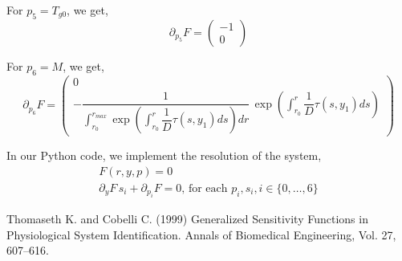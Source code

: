 \documentclass[11pt,a4paper]{article}
\begin{document}
\noindent
For $ p_5 = T_{g0} $, we get, 
$$\partial_{p_5} F = \begin{pmatrix} 
-1 \\  0
\end{pmatrix} 
$$


\noindent
For $ p_6 = M $, we get, 
$$\partial_{p_6} F = \begin{pmatrix} 
0 \\ 
- \dfrac{1}{\displaystyle \int_{r_{0}}^{r_{max}} \exp  \left(\displaystyle \int_{r_{0}}^{r} \dfrac{1}{D} \tau(s, y_1) ds \right) dr}  \, \exp \left(\displaystyle  \int_{r_{0}}^{r} \dfrac{1}{D} \tau(s, y_1) ds \right)
\end{pmatrix} 
$$


\vspace{1cm}
In our Python code, we implement the resolution of the system, 
$$\begin{array}{l}
F(r, y, p) = 0 \\
\partial_y F \, s_i + \partial_{p_i} F = 0 , \, \text{for each }p_i, s_i, i \in \lbrace 0, \dots, 6\rbrace
\end{array}$$

\vspace{1cm}


\begin{thebibliography}{10}

 Thomaseth K. and Cobelli C. (1999) Generalized Sensitivity Functions in Physiological System Identification. Annals of Biomedical Engineering, Vol. 27, 607--616.

\end{thebibliography}
\end{document}

